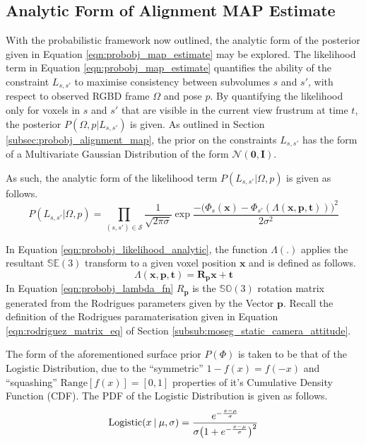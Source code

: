 \subsection{Analytic Form of Alignment MAP Estimate}
\label{subsec:probobj_analytic_alignment_map}
With the probabilistic framework now outlined, the analytic form of the
posterior given in Equation \ref{eqn:probobj_map_estimate} may be explored. The
likelihood term in Equation \ref{eqn:probobj_map_estimate} quantifies the
ability of the constraint $L_{s, s'}$ to maximise consistency between subvolumes
$s$ and $s'$, with respect to observed RGBD frame $\Omega$ and pose $p$. By
quantifying the likelihood only for voxels in $s$ and $s'$ that are visible in
the current view frustrum at time $t$, the posterior $P(\Omega, p | L_{s, s'})$
is given. As outlined in Section \ref{subsec:probobj_alignment_map}, the prior
on the constraints $L_{s, s'}$ has the form of a Multivariate Gaussian
Distribution of the form $\mathcal{N}(\mathbf{0}, \mathbf{I})$.

As such, the analytic form of the likelihood term $P(L_{s, s'} | \Omega, p)$ is
given as follows.
\begin{equation}
  \label{eqn:probobj_likelihood_analytic}
  P(L_{s, s'} | \Omega, p) = \prod_{(s, s') \in \mathcal{S}}
  \frac{1}{\sqrt{2 \pi \sigma}}
  \exp{\frac{-\big(\Phi_{s}(\mathbf{x}) -
  \Phi_{s'}(\Lambda(\mathbf{x}, \mathbf{p}, \mathbf{t}))\big)^{2}}
  {2\sigma^{2}}}
\end{equation}

In Equation \ref{eqn:probobj_likelihood_analytic}, the function $\Lambda(.)$
applies the resultant $\mathbb{SE}(3)$ transform to a given voxel position
$\mathbf{x}$ and is defined as follows.
\begin{equation}
  \label{eqn:probobj_lambda_fn}
  \Lambda(\mathbf{x}, \mathbf{p}, \mathbf{t}) =
  \mathbf{R}_{\mathbf{p}} \mathbf{x} + \mathbf{t}
\end{equation}
In Equation \ref{eqn:probobj_lambda_fn} $R_{\mathbf{p}}$ is the $\mathbb{SO}(3)$
rotation matrix generated from the Rodrigues parameters given by the Vector
$\mathbf{p}$. Recall the definition of the Rodrigues paramaterisation given in
Equation \ref{eqn:rodriguez_matrix_eq} of Section
\ref{subsub:moseg_static_camera_attitude}.

The form of the aforementioned surface prior $P(\Phi)$ is taken to be that of
the Logistic Distribution, due to the ``symmetric'' $1 - f(x) = f(-x)$
and ``squashing'' $\text{Range}[f(x)] = [0, 1]$ properties of it's Cumulative
Density Function (CDF). The PDF of the Logistic Distribution is given as follows.
\begin{equation}
  \label{eqn:probobj_logistic_dist}
  \text{Logistic}(x \:\vert\: \mu, \sigma) = \frac
  {e^{-\frac{x - \mu}{\sigma}}}
  {\sigma \big( 1 + e^{-\frac{x - \mu}{\sigma}} \big)^{2}}
\end{equation}

